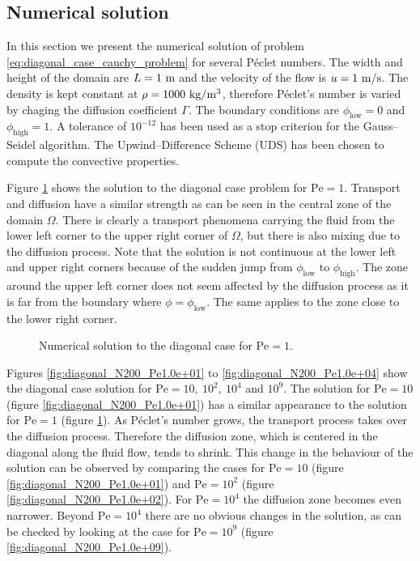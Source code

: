 
\subsection{Numerical solution}

In this section we present the numerical solution of problem \eqref{eq:diagonal_case_cauchy_problem} for several Péclet numbers. The width and height of the domain are $L = 1 \ \meter$ and the velocity of the flow is $u = 1 \ \meter / \second$. The density is kept constant at $\rho = 1000 \ \kilo\gram / \meter^3$, therefore Péclet's number is varied by chaging the diffusion coefficient $\Gamma$. The boundary conditions are $\phi_\text{low} = 0$ and $\phi_\text{high} = 1$. A tolerance of $10^{-12}$ has been used as a stop criterion for the Gauss--Seidel algorithm. The Upwind--Difference Scheme (UDS) has been chosen to compute the convective properties.

Figure \ref{fig:diagonal_N200_Pe1.0e+00} shows the solution to the diagonal case problem for $\mathrm{Pe} = 1$. Transport and diffusion have a similar strength as can be seen in the central zone of the domain $\Omega$. There is clearly a transport phenomena carrying the fluid from the lower left corner to the upper right corner of $\Omega$, but there is also mixing due to the diffusion process. Note that the solution is not continuous at the lower left and upper right corners because of the sudden jump from $\phi_\text{low}$ to $\phi_\text{high}$. The zone around the upper left corner does not seem affected by the diffusion process as it is far from the boundary where $\phi = \phi_\text{low}$. The same applies to the zone close to the lower right corner.

\begin{figure}[h]
	\centering
	\vspace{-0.75cm}
	
	\vspace{-0.50cm}
	\caption{Numerical solution to the diagonal case for $\mathrm{Pe} = 1$.}
	\label{fig:diagonal_N200_Pe1.0e+00}
\end{figure}

\clearpage
Figures \eqref{fig:diagonal_N200_Pe1.0e+01} to \eqref{fig:diagonal_N200_Pe1.0e+04} show the diagonal case solution for $\mathrm{Pe} = 10, \ 10^2, \ 10^4$ and $10^9$. The solution for $\mathrm{Pe} = 10$ (figure \ref{fig:diagonal_N200_Pe1.0e+01}) has a similar appearance to the solution for $\mathrm{Pe} = 1$ (figure \ref{fig:diagonal_N200_Pe1.0e+00}). As Péclet's number grows, the transport process takes over the diffusion process. Therefore the diffusion zone, which is centered in the diagonal along the fluid flow, tends to shrink. This change in the behaviour of the solution can be observed by comparing the cases for $\mathrm{Pe} = 10$ (figure \ref{fig:diagonal_N200_Pe1.0e+01}) and $\mathrm{Pe} = 10^2$ (figure \ref{fig:diagonal_N200_Pe1.0e+02}). For $\mathrm{Pe} = 10^4$ the diffusion zone becomes even narrower. Beyond $\mathrm{Pe} = 10^4$ there are no obvious changes in the solution, as can be checked by looking at the case for $\mathrm{Pe} = 10^9$ (figure \ref{fig:diagonal_N200_Pe1.0e+09}).


